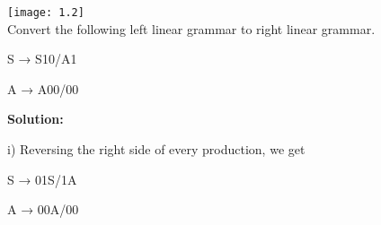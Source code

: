 \documentclass[10pt,a4paper]{book}
\begin{document}
\begin{flushleft}
\begin{figure}[h]
  \texttt{[image: 1.2]}\\ Convert the following left linear grammar to right linear grammar.
  
  \qquad\qquad\qquad\qquad\qquad S → S10/A1
  
  \qquad\qquad\qquad\qquad\qquad A → A00/00
  
  \textbf{\textsf{Solution:}}
  
  \quad i) Reversing the right side of every production, we get
  
  \qquad\qquad\qquad\qquad\qquad S → 01S/1A
  
  \qquad\qquad\qquad\qquad\qquad A → 00A/00
\end{figure}
  
\end{flushleft}
\end{document}
